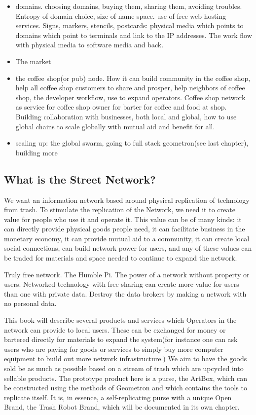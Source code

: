 \begin{itemize}
  \item
  domains.  choosing domains, buying them, sharing them, avoiding troubles. Entropy of domain choice, size of name space. use of free web hosting services.  Signs, markers, stencils, postcards: physical media which points to domains which point to terminals and link to the IP addresses.  The work flow with physical media to software media and back.
  \item
  The market
  \item
  the coffee shop(or pub) node.  How it can build community in the coffee shop, help all coffee shop customers to share and prosper, help neighbors of coffee shop, the developer workflow, use to expand operators.  Coffee shop network as service for coffee shop owner for barter for coffee and food at shop.  Building collaboration with businesses, both local and global, how to use global chains to scale globally with mutual aid and benefit for all.
  \item
  scaling up: the global swarm, going to full stack geometron(see last chapter), building more 
\end{itemize}

\subsection{What is the Street Network?}

We want an information network based around physical replication of technology from trash.  To stimulate the replication of the Network, we need it to create value for people who use it and operate it. This value can be of many kinds: it can directly provide physical goods people need, it can facilitate business in the monetary economy, it can provide mutual aid to a community, it can create local social connections, can build network power for users, and any of these values can be traded for materials and space needed to continue to expand the network.  

Truly free network. The Humble Pi.  The power of a network without property or users.  Networked technology with free sharing can create more value for users than one with private data.  Destroy the data brokers by making a network with no personal data.   

This book will describe several products and services which Operators in the network can provide to local users.  These can be exchanged for money or bartered directly for materials to expand the system(for instance one can ask users who are paying for goods or services to simply buy more computer equipment to build out more network infrastructure.)  We aim to have the goods sold be as much as possible based on a stream of trash which are upcycled into sellable products.  The prototype product here is a purse, the ArtBox, which can be constructed using the methods of Geometron and which contains the tools to replicate itself.  It is, in essence, a self-replicating purse with a unique Open Brand, the Trash Robot Brand, which will be documented in its own chapter.  

